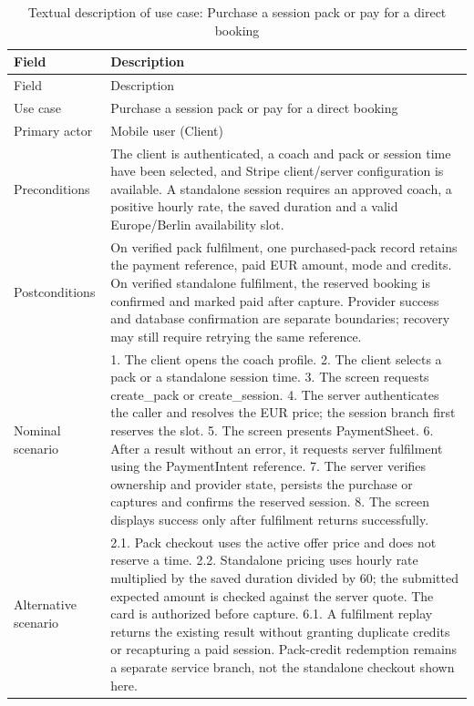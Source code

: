 \documentclass[12pt,a4paper,openany]{report}
\begin{document}
\begingroup
\footnotesize
\setlength{\tabcolsep}{3pt}
\renewcommand{\arraystretch}{1.20}
\setlength{\LTpre}{5pt}
\setlength{\LTpost}{10pt}
\begin{longtable}{|L{4.95cm}|L{10.05cm}|}
\caption{Textual description of use case: Purchase a session pack or pay for a direct booking}\label{tab:pdf-71-32} \\
\hline
{}
Field & Description \\ \hline
\endfirsthead
\hline
{}
Field & Description \\ \hline
\endhead
Use case & Purchase a session pack or pay for a direct booking \\ \hline
Primary actor & Mobile user (Client) \\ \hline
Preconditions & The client is authenticated, a coach and pack or session time have been selected, and Stripe client/server configuration is available. A standalone session requires an approved coach, a positive hourly rate, the saved duration and a valid Europe/Berlin availability slot. \\ \hline
Postconditions & On verified pack fulfilment, one purchased-pack record retains the payment reference, paid EUR amount, mode and credits. On verified standalone fulfilment, the reserved booking is confirmed and marked paid after capture. Provider success and database confirmation are separate boundaries; recovery may still require retrying the same reference. \\ \hline
Nominal scenario & 1. The client opens the coach profile. 2. The client selects a pack or a standalone session time. 3. The screen requests create\_pack or create\_session. 4. The server authenticates the caller and resolves the EUR price; the session branch first reserves the slot. 5. The screen presents PaymentSheet. 6. After a result without an error, it requests server fulfilment using the PaymentIntent reference. 7. The server verifies ownership and provider state, persists the purchase or captures and confirms the reserved session. 8. The screen displays success only after fulfilment returns successfully. \\ \hline
Alternative scenario & 2.1. Pack checkout uses the active offer price and does not reserve a time. 2.2. Standalone pricing uses hourly rate multiplied by the saved duration divided by 60; the submitted expected amount is checked against the server quote. The card is authorized before capture. 6.1. A fulfilment replay returns the existing result without granting duplicate credits or recapturing a paid session. Pack-credit redemption remains a separate service branch, not the standalone checkout shown here. \\ \hline

\end{longtable}
\end{document}

